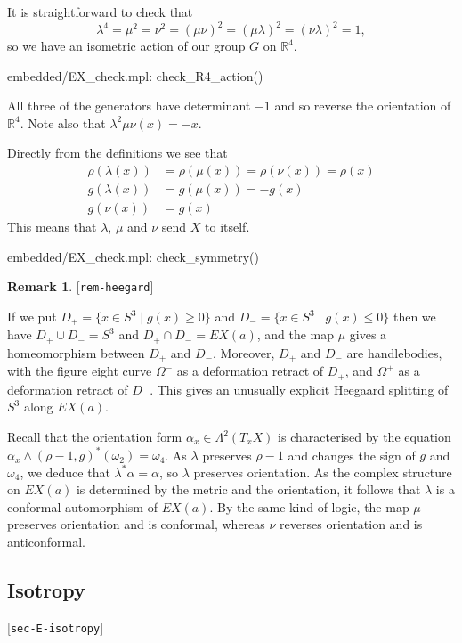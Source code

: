 \documentclass[reqno]{amsart}
\newcommand{\lbl}[1]{\label{#1}\textup{[\texttt{#1}]}\par}
\newcommand{\lbl}{\label}
\newcommand{\Lm}        {\Lambda}
\newcommand{\Om}        {\Omega}
\newcommand{\al}        {\alpha}
\newcommand{\lm}        {\lambda}
\newcommand{\om}        {\omega}
\newcommand{\R}         {{\mathbb{R}}}
\newcommand{\st}        {\;|\;}
\renewcommand{\:}{\colon}
\theoremstyle{definition}
\newtheorem{remark}[theorem]{Remark}
\begin{document}
It is straightforward to check that
\[ \lm^4=\mu^2=\nu^2=(\mu\nu)^2=(\mu\lm)^2=(\nu\lm)^2=1, \]
so we have an isometric action of our group $G$ on $\R^4$.
\begin{checks}
 embedded/EX_check.mpl: check_R4_action()
\end{checks}
All three of the generators have determinant $-1$ and so reverse the
orientation of $\R^4$.  Note also that $\lm^2\mu\nu(x)=-x$.

Directly from the definitions we see that
\begin{align*}
 \rho(\lm(x)) &= \rho(\mu(x))=\rho(\nu(x))=\rho(x) \\
 g(\lm(x))    &= g(\mu(x))=-g(x) \\
 g(\nu(x))    &= g(x)
\end{align*}
This means that $\lm$, $\mu$ and $\nu$ send $X$ to itself.
\begin{checks}
 embedded/EX_check.mpl: check_symmetry()
\end{checks}

\begin{remark}\lbl{rem-heegard}
 If we put $D_+=\{x\in S^3\st g(x)\geq 0\}$ and
 $D_-=\{x\in S^3\st g(x)\leq 0\}$ then we have $D_+\cup D_-=S^3$ and
 $D_+\cap D_-=EX(a)$, and the map $\mu$ gives a homeomorphism between
 $D_+$ and $D_-$.  Moreover, $D_+$ and $D_-$ are handlebodies, with
 the figure eight curve $\Om^-$ as a deformation retract of $D_+$, and
 $\Om^+$ as a deformation retract of $D_-$.  This gives an unusually
 explicit Heegaard splitting of $S^3$ along $EX(a)$.
\end{remark}

Recall that the orientation form $\al_x\in\Lm^2(T_xX)$ is
characterised by the equation $\al_x\wedge (\rho-1,g)^*(\om_2)=\om_4$.
As $\lm$ preserves $\rho-1$ and changes the sign of $g$ and $\om_4$,
we deduce that $\lm^*\al=\al$, so $\lm$ preserves orientation.  As the
complex structure on $EX(a)$ is determined by the metric and the
orientation, it follows that $\lm$ is a conformal automorphism of
$EX(a)$.  By the same kind of logic, the map $\mu$ preserves
orientation and is conformal, whereas $\nu$ reverses orientation and
is anticonformal.

\subsection{Isotropy}
\lbl{sec-E-isotropy}
\end{document}
